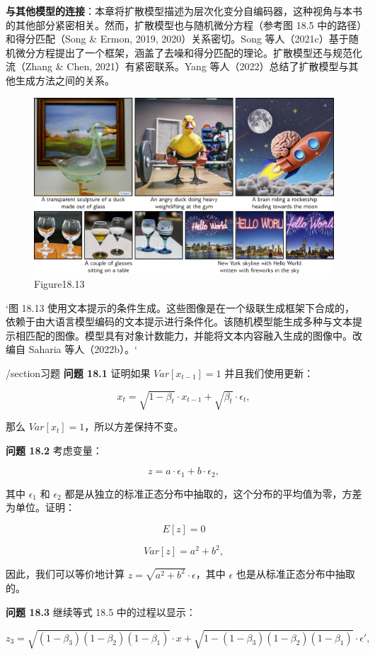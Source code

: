 \textbf{与其他模型的连接}：本章将扩散模型描述为层次化变分自编码器，这种视角与本书的其他部分紧密相关。然而，扩散模型也与随机微分方程（参考图 18.5 中的路径）和得分匹配（Song & Ermon, 2019, 2020）关系密切。Song 等人（2021c）基于随机微分方程提出了一个框架，涵盖了去噪和得分匹配的理论。扩散模型还与规范化流（Zhang & Chen, 2021）有紧密联系。Yang 等人（2022）总结了扩散模型与其他生成方法之间的关系。


\begin{figure}[h!]
\centering
\includegraphics[width=0.7\linewidth]{png/chapter18/DiffusionImagen.png}
\caption{Figure18.13}
\end{figure}

`图 18.13 使用文本提示的条件生成。这些图像是在一个级联生成框架下合成的，依赖于由大语言模型编码的文本提示进行条件化。该随机模型能生成多种与文本提示相匹配的图像。模型具有对象计数能力，并能将文本内容融入生成的图像中。改编自 Saharia 等人（2022b）。`

/section{习题}
\textbf{问题 18.1} 证明如果 \(Var[x_{t-1}] = 1\) 并且我们使用更新：

\[
x_t = \sqrt{1 - \beta_t} \cdot x_{t-1} + \sqrt{\beta_t} \cdot \epsilon_t, \tag{18.41}
\]

那么 \(Var[x_t] = 1\)，所以方差保持不变。

\textbf{问题 18.2} 考虑变量：

\[
z = a \cdot \epsilon_1 + b \cdot \epsilon_2, \tag{18.42}
\]

其中 \(\epsilon_1\) 和 \(\epsilon_2\) 都是从独立的标准正态分布中抽取的，这个分布的平均值为零，方差为单位。证明：

\[
E[z] = 0
\]

\[
Var[z] = a^2 + b^2, \tag{18.43}
\]

因此，我们可以等价地计算 \(z = \sqrt{a^2 + b^2} \cdot \epsilon\)，其中 \(\epsilon\) 也是从标准正态分布中抽取的。

\textbf{问题 18.3} 继续等式 18.5 中的过程以显示：

\[
z_3 = \sqrt{(1 - \beta_3)(1 - \beta_2)(1 - \beta_1)} \cdot x + \sqrt{1 - (1 - \beta_3)(1 - \beta_2)(1 - \beta_1)} \cdot \epsilon', \tag{18.44}
\]

